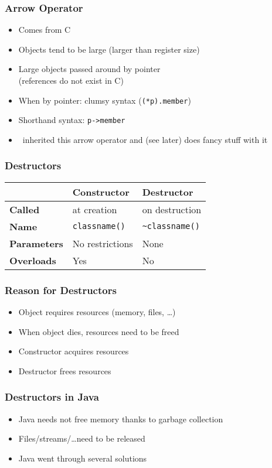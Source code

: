 \documentclass{../ucll-slides}
\begin{document}
\begin{frame}
  \frametitle{Arrow Operator}
  \begin{itemize}
    \item Comes from C
    \item Objects tend to be large (larger than register size)
    \item Large objects passed around by pointer \\ (references do not exist in C)
    \item When by pointer: clumsy syntax ({\tt (*p).member})
    \item Shorthand syntax: {\tt p->member}
    \item \cpp\ inherited this arrow operator and (see later) does fancy stuff with it
  \end{itemize}
\end{frame}

\begin{frame}
  \frametitle{Destructors}
  \begin{center}
    \begin{tabular}{lll}
      & \textbf{Constructor} & \textbf{Destructor} \\
      \toprule
      \textbf{Called} & at creation & on destruction \\
      \textbf{Name} & {\tt classname()} & {\tt \~{}classname()} \\
      \textbf{Parameters} & No restrictions & None \\
      \textbf{Overloads} & Yes & No \\
    \end{tabular}
  \end{center}
  \vskip5mm
\end{frame}

\begin{frame}
  \frametitle{Reason for Destructors}
  \begin{itemize}
    \item Object requires resources (memory, files, \dots)
    \item When object dies, resources need to be freed
    \item Constructor acquires resources
    \item Destructor frees resources
  \end{itemize}
\end{frame}

\begin{frame}
  \frametitle{Destructors in Java}
  \begin{itemize}
    \item Java needs not free memory thanks to garbage collection
    \item Files/streams/\dots need to be released
    \item Java went through several solutions
  \end{itemize}
\end{frame}
\end{document}
